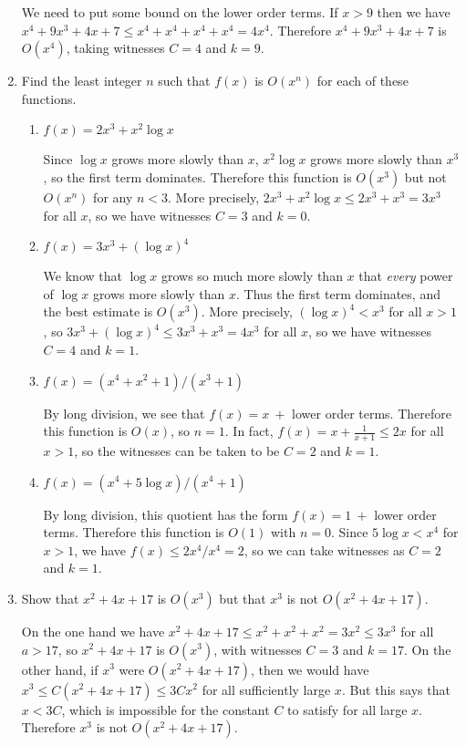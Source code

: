 \documentclass[11pt]{article}
\begin{document}
\begin{enumerate}[label=\textbf{\arabic*.}]
	We need to put some bound on the lower order terms. If $x > 9$ then we have $x^4 + 9x^3 + 4x + 7 \leq x^4 + x^4 + x^4 + x^4 = 4x^4$. Therefore $x^4 + 9x^3 + 4x + 7$ is $O(x^4)$, taking witnesses $C = 4$ and $k = 9$.
	
	\item Find the least integer $n$ such that $f(x)$ is $O(x^n)$ for each of these functions.
	
	\begin{enumerate}[label=\textbf{\alph*)}]
		\item $f(x) = 2x^3 + x^2 \log x$
		
		Since $\log x$ grows more slowly than $x$, $x^2 \log x$ grows more slowly than $x^3$, so the first term dominates. Therefore this function is $O(x^3)$ but not $O(x^n)$ for any $n < 3$. More precisely, $2x^3 + x^2 \log x \leq 2x^3 + x^3 = 3x^3$ for all $x$, so we have witnesses $C = 3$ and $k = 0$.
		
		\item $f(x) = 3x^3 + (\log x)^4$
		
		We know that $\log x$ grows so much more slowly than $x$ that \emph{every} power of $\log x$ grows more slowly than $x$. Thus the first term dominates, and the best estimate is $O(x^3)$. More precisely, $(\log x)^4 < x^3$ for all $x > 1$, so $3x^3 + (\log x)^4 \leq 3x^3 + x^3 = 4x^3$ for all $x$, so we have witnesses $C = 4$ and $k = 1$.
		
		\item $f(x) = (x^4 + x^2 + 1) / (x^3 + 1)$
		
		By long division, we see that $f(x) = x\ + $ lower order terms. Therefore this function is $O(x)$, so $n = 1$. In fact, $f(x) = x + \frac{1}{x + 1} \leq 2x$ for all $x > 1$, so the witnesses can be taken to be $C = 2$ and $k = 1$.
		
		\item $f(x) = (x^4 + 5 \log x) / (x^4 + 1)$
		
		By long division, this quotient has the form $f(x) = 1\ + $ lower order terms. Therefore this function is $O(1)$ with $n = 0$. Since $5 \log x < x^4$ for $x > 1$, we have $f(x) \leq 2x^4 / x^4 = 2$, so we can take witnesses as $C = 2$ and $k = 1$.
	\end{enumerate}

	\item Show that $x^2 + 4x + 17$ is $O(x^3)$ but that $x^3$ is not $O(x^2 + 4x + 17)$.
	
	On the one hand we have $x^2 + 4x + 17 \leq x^2 + x^2 + x^2 = 3x^2 \leq 3x^3$ for all $a > 17$, so $x^2 + 4x + 17$ is $O(x^3)$, with witnesses $C = 3$ and $k = 17$. On the other hand, if $x^3$ were $O(x^2 + 4x + 17)$, then we would have $x^3 \leq C(x^2 + 4x + 17) \leq 3Cx^2$ for all sufficiently large $x$. But this says that $x < 3C$, which is impossible for the constant $C$ to satisfy for all large $x$. Therefore $x^3$ is not $O(x^2 + 4x + 17)$.
	

\end{enumerate}
\end{document}
